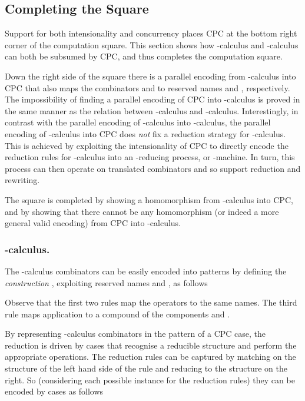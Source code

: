 \documentclass{llncs}
\begin{document}
\subsection{Completing the Square}
\label{ssec:completing}

Support for both intensionality and concurrency places CPC at the bottom right corner of the computation square.
This section shows how -calculus and -calculus can both be subsumed by CPC, and thus completes the computation square.


Down the right side of the square there is a parallel encoding from -calculus into CPC that also maps the combinators  and  to reserved names  and , respectively.
The impossibility of finding a parallel encoding of CPC into -calculus is proved in the same manner as the relation between -calculus and -calculus.
Interestingly, in contrast with the parallel encoding of -calculus into -calculus,
the parallel encoding of -calculus into CPC does {\em not} fix a reduction strategy for -calculus.
This is achieved by exploiting the intensionality of CPC to directly encode the reduction rules for -calculus into an -reducing process, or -machine.
In turn, this process can then operate on translated combinators and so support reduction and rewriting.

The square is completed by showing a homomorphism from -calculus into CPC, and by showing that there cannot be any homomorphism (or indeed a more general valid encoding) from CPC into -calculus.


\subsubsection*{-calculus.}
\label{sssec:SF2CPC}

The -calculus combinators  can be easily encoded into patterns by defining the {\em construction} , exploiting reserved names  and , as follows

Observe that the first two rules map the operators to the same names. The third rule maps application to a compound of the components  and .

By representing -calculus combinators in the pattern of a CPC case,
the reduction is driven by cases that recognise a reducible structure and perform the appropriate operations.
The reduction rules can be captured by matching on the structure of the left hand side of the rule and reducing to the structure on the right. So (considering each possible instance for the  reduction rules) they can be encoded by cases as follows
\small
\end{document}
